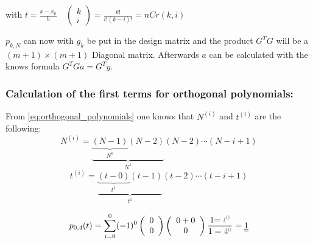 with $t=\frac{x-x_{0}}{h} \quad\left(\begin{array}{l}k \\ i\end{array}\right)=\frac{k !}{i !(k-i) !}=n C r(k, i)$

$p_{k, N}$ can now with $g_{k}$ be put in the design matrix and the product $G^{T} G$ will be a $(m+1) \times(m+1)$ Diagonal matrix. Afterwards $a$ can be calculated with the knows formula $G^{T} G a=G^{T} y$.

\subsubsection{Calculation of the first terms for orthogonal polynomials:}\label{subsubsec:calc_orthog}
From \autoref{eq:orthogonal_polynomials} one knows that $N^{(i)}$ and $t^{(i)}$ are the following:
\begin{equation}
N^{(i)}=\underbrace{\underbrace{(N-1)}_{N^0}(N-2)}_{N^1}(N-2) \cdots(N-i+1)
\end{equation}
\begin{equation}
t^{(i)}=\underbrace{\underbrace{(t-0)}_{t^1}(t-1)}_{t^1}(t-2) \cdots(t-i+1)
\end{equation}


$$
p_{0, 4}(t)=\sum_{i=0}^0(-1)^0\left(\begin{array}{c}
0 \\
0
\end{array}\right)\left(\begin{array}{c}
0+0 \\
0
\end{array}\right) \frac{1\textcolor{gray}{=t^{0}}}{1=\textcolor{gray}{4^0}} =\underline{\underline{1}}
$$

